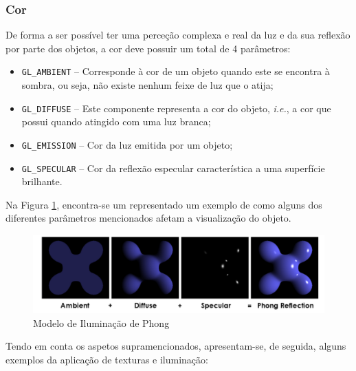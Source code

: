 \documentclass[a4paper, 11pt]{article}
\begin{document}
\subsubsection*{Cor}

De forma a ser possível ter uma perceção complexa e real da luz e da sua reflexão por parte dos 
objetos, a cor deve possuir um total de 4 parâmetros:

\begin{itemize}
    \item \texttt{GL\_AMBIENT} -- Corresponde à cor de um objeto quando este se encontra à 
sombra, ou seja, não existe nenhum feixe de luz que o atija;
    \item \texttt{GL\_DIFFUSE} -- Este componente representa a cor do objeto, \textit{i.e.}, a cor 
que possui quando atingido com uma luz branca;
    \item \texttt{GL\_EMISSION} -- Cor da luz emitida por um objeto;
    \item \texttt{GL\_SPECULAR} -- Cor da reflexão especular característica a uma superfície 
brilhante.
\end{itemize}

\pagebreak

Na Figura \ref{fig:phong}, encontra-se um representado um exemplo de como alguns dos diferentes 
parâmetros mencionados afetam  a visualização do objeto.

\begin{figure}[H]
    \centering
    \includegraphics[width=\textwidth]{img/phong.png}
    \caption{Modelo de Iluminação de Phong}
    \label{fig:phong}
\end{figure}

Tendo em conta os aspetos supramencionados, apresentam-se, de seguida, alguns exemplos da 
aplicação de texturas e iluminação:
\end{document}
